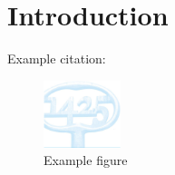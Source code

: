 \mainmatter
\pagestyle{headings}

\chapter{Introduction}
Example citation: \cite{von2007theory}


\begin{figure}
	\includegraphics[width=0.2\textwidth]{../LaTeX/Figures/Picture2.png}
	\caption{Example figure}
\end{figure}

